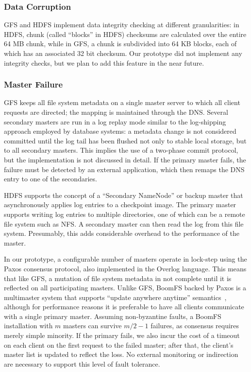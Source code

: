 \documentclass[twocolumn]{article}
\begin{document}
\subsubsection{Data Corruption}
GFS and HDFS implement data integrity checking at different
granularities: in HDFS, chunk (called ``blocks'' in HDFS) checksums
are calculated over the entire 64 MB chunk, while in GFS, a chunk is
subdivided into 64 KB blocks, each of which has an associated 32 bit
checksum.  Our prototype did not implement any integrity checks, but
we plan to add this feature in the near future.

\subsubsection{Master Failure}
GFS keeps all file system metadata on a single master server to which
all client requests are directed; the mapping is maintained through
the DNS.  Several secondary masters are run in a log replay mode
similar to the log-shipping approach employed by database systems: a
metadata change is not considered committed until the log tail has
been flushed not only to stable local storage, but to all secondary
masters.  This implies the use of a two-phase commit protocol, but the
implementation is not discussed in detail.  If the primary master
fails, the failure must be detected by an external application, which
then remaps the DNS entry to one of the secondaries.
 
HDFS supports the concept of a ``Secondary NameNode'' or backup master
that asynchronously applies log entries to a checkpoint image.  The
primary master supports writing log entries to multiple directories,
one of which can be a remote file system such as NFS.  A secondary
master can then read the log from this file system.  Presumably, this
adds considerable overhead to the performance of the master.
 
In our prototype, a configurable number of masters operate in
lock-step using the Paxos consensus protocol, also implemented in the
Overlog language.  This means that like GFS, a mutation of file system
metadata in not complete until it is reflected on all participating
masters.  Unlike GFS, BoomFS backed by Paxos is a multimaster system that
supports ``update anywhere anytime''
semantics~\cite{dangers-of-replication}, although for performance
reasons it is preferable to have all clients communicate with a single
primary master.  Assuming non-byzantine faults, a BoomFS installation
with $m$ masters can survive $m/2 - 1$ failures, as consensus requires
merely simple minority.  If the primary fails, we also incur the cost
of a timeout on each client on the first request to the failed master;
after that, the client's master list is updated to reflect the loss.
No external monitoring or indirection are necessary to support this
level of fault tolerance.
\end{document}
